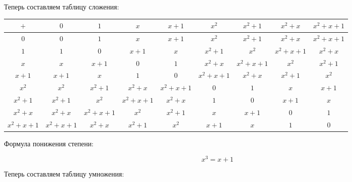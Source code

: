 \documentclass[a4paper,12pt]{article}
\begin{document}
\begin{center}
Теперь составляем таблицу сложения:
\end{center}

\begin{center}
{\footnotesize \begin{tabular}{|c|c|c|c|c|c|c|c|c|}
\hline
 $+$ & $0$ & $1$ & $x$ & $x + 1 $ &  $x^2$& $ x^2 + 1$ & $x^2 + x$  &$  x^2 + x + 1 $\\
\hline
 $0$&  $0$&$1$  &$x$  &$x+1$  &$x^2$  &$x^2+1$ &$x^2+x$   & $x^2 + x + 1$ \\
\hline
$1$ & $1$ &  $0$& $x + 1$  &$x$  &$x^2 + 1$  & $x^2$ &  $x^2 + x + 1$& $x^2 + x$ \\
\hline
 $x$& $x$ &  $x+1$&  $0$&$1$  & $x^2 + x$ &  $x^2 + x + 1$&  $x^2$& $x^2 + 1$ \\
\hline
$x + 1$ & $x + 1$ & $x$& $1$ &$0$  &$x^2 + x  +1$  &$x^2 + x$  & $x^2 + 1$ &$x^2$  \\
\hline
$x^2$ &$x^2$  &$x^2 + 1$  &$x^2 + x$  & $x^2 + x + 1$ & $0$ & $1$ &$x$  &$x+1$  \\
\hline
 $x^2 + 1$&$x^2 + 1$  & $x^2$ & $x^2 + x +1$ & $x^2 + x$ &  $1$&$0$  &  $x + 1$&  $x$\\
\hline
 $x^2 + x$&$x^2 + x$  &$x^2 + x + 1$  & $x^2$ & $x^2 + 1$ &  $x$& $x+1$ &$0$  & $1$ \\
\hline
 $x^2 + x + 1$& $x^2 + x +1$ & $x^2+x$ &$x^2+1$  &$x^2$  &$x + 1$  & $x$ & $1$ & $0$ \\
\hline
\end{tabular}
}
\end{center}

\begin{center}
Формула понижения степени:
\end{center}
\[
x^3 = x + 1
\]

\begin{center}
Теперь составляем таблицу умножения:
\end{center}
\end{document}
